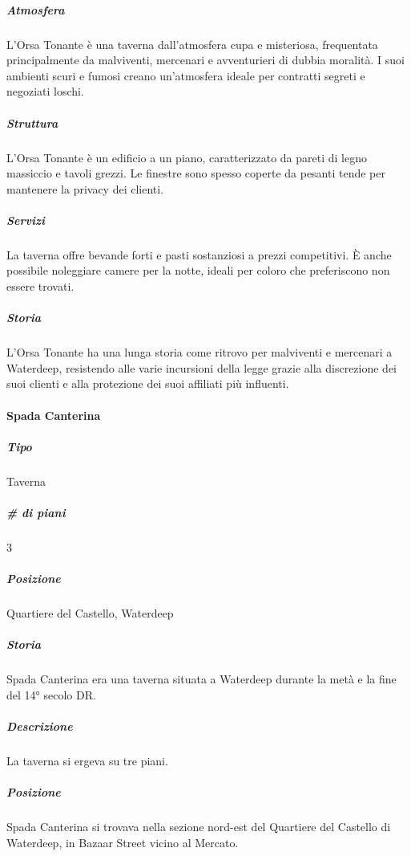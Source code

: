 \documentclass{article}
\begin{document}
                      \subparagraph{Atmosfera}
                              L'Orsa Tonante è una taverna dall'atmosfera cupa e misteriosa, frequentata principalmente da malviventi, mercenari e avventurieri di dubbia moralità. I suoi ambienti scuri e fumosi creano un'atmosfera ideale per contratti segreti e negoziati loschi.

                      \subparagraph{Struttura}
                            L'Orsa Tonante è un edificio a un piano, caratterizzato da pareti di legno massiccio e tavoli grezzi. Le finestre sono spesso coperte da pesanti tende per mantenere la privacy dei clienti.

                      \subparagraph{Servizi}
                                  La taverna offre bevande forti e pasti sostanziosi a prezzi competitivi. È anche possibile noleggiare camere per la notte, ideali per coloro che preferiscono non essere trovati.

                      \subparagraph{Storia}
                        L'Orsa Tonante ha una lunga storia come ritrovo per malviventi e mercenari a Waterdeep, resistendo alle varie incursioni della legge grazie alla discrezione dei suoi clienti e alla protezione dei suoi affiliati più influenti.



                  \paragraph{Spada Canterina}

                      \subparagraph{Tipo}
Taverna

                      \subparagraph{\# di piani}
3

                      \subparagraph{Posizione}
Quartiere del Castello, Waterdeep

                      \subparagraph{Storia}
Spada Canterina era una taverna situata a Waterdeep durante la metà e la fine del 14° secolo DR.

                      \subparagraph{Descrizione}
La taverna si ergeva su tre piani.

                      \subparagraph{Posizione}
Spada Canterina si trovava nella sezione nord-est del Quartiere del Castello di Waterdeep, in Bazaar Street vicino al Mercato.



                  \paragraph{}
\end{document}
